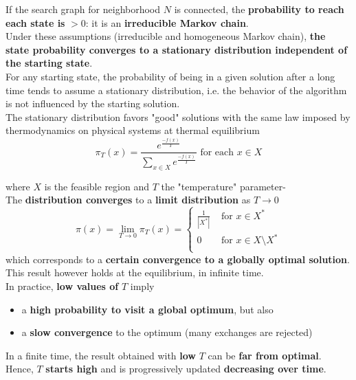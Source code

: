 If the search graph for neighborhood $N$ is connected, the \textbf{probability to reach each state is} $> 0$: it is an \textbf{irreducible Markov chain}.\\

Under these assumptions (irreducible and homogeneous Markov chain), \textbf{the state probability converges to a stationary distribution independent of the starting state}. \\
For any starting state, the probability of being in a given solution after a long time tends to assume a stationary distribution, i.e. the behavior of the algorithm is not influenced by the starting solution.\\


The stationary distribution favors "good" solutions with the same law imposed by thermodynamics on physical systems at thermal equilibrium
$$ \pi_T (x) = \frac{ e^{\frac{-f(x)}{T}} }{ \sum_{x \in X} e^{\frac{-f(x)}{T}} } \text{ for each } x \in X $$

where $X$ is the feasible region and $T$ the "temperature" parameter-\\

The \textbf{distribution converges} to a \textbf{limit distribution} as $T \rightarrow 0$
$$ \pi (x) = \lim_{T \rightarrow 0} \pi_T (x) = \begin{cases}
	\frac{1}{|X^\ast|} & \text{ for } x \in X^\ast \\
	0 & \text{ for } x \in X \setminus X^\ast\\
\end{cases}$$
which corresponds to a \textbf{certain convergence to a globally optimal solution}.\\

This result however holds at the equilibrium, in infinite time.\\

In practice, \textbf{low values of} $T$ imply
\begin{itemize}
	\item a \textbf{high probability to visit a global optimum}, but also
	\item a \textbf{slow convergence} to the optimum (many exchanges are rejected)
\end{itemize}

In a finite time, the result obtained with \textbf{low} $T$ can be \textbf{far from optimal}.\\
Hence, $T$ \textbf{starts high} and is progressively updated \textbf{decreasing over time}.\\

